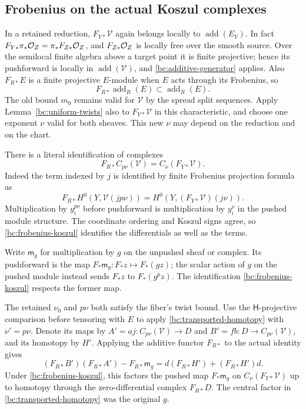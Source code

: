 \subsection{Frobenius on the actual Koszul complexes}

In a retained reduction, $F_{Y*}\mathcal V$ again belongs locally to
$\operatorname{add}(E_Y)$.  In fact
$F_{Y*}\pi_*\mathcal O_Z=\pi_*F_{Z*}\mathcal O_Z$, and
$F_{Z*}\mathcal O_Z$ is locally free over the smooth source.  Over the
semilocal finite algebra above a target point it is finite projective; hence its
pushforward is locally in $\operatorname{add}(\mathcal V)$, and
\eqref{bc:additive-generator} applies.  Also $F_{R*}E$ is a finite
projective $E$-module when $E$ acts through its Frobenius, so
\begin{equation}\label{bc:frobenius-add}
             F_{R*}\operatorname{add}_R(E)
                             \subset\operatorname{add}_R(E).
\end{equation}
The old bound $m_0$ remains valid for $\mathcal V$ by the spread split
sequences.  Apply Lemma~\ref{bc:uniform-twists} also to
$F_{Y*}\mathcal V$ in this characteristic, and choose one exponent
$\nu$ valid for both sheaves.  This new $\nu$ may depend on the reduction
and on the chart.

There is a literal identification of complexes
\begin{equation}\label{bc:frobenius-koszul}
 F_{R*}C_{p\nu}(\mathcal V)=C_\nu(F_{Y*}\mathcal V).
\end{equation}
Indeed the term indexed by $j$ is identified by finite Frobenius
projection formula as
\[
 F_{R*}H^0(Y,\mathcal V(jp\nu))
      =H^0(Y,(F_{Y*}\mathcal V)(j\nu)).
\]
Multiplication by $y_i^{p\nu}$ before pushforward is multiplication by
$y_i^\nu$ in the pushed module structure.  The coordinate ordering and
Koszul signs agree, so \eqref{bc:frobenius-koszul} identifies the
differentials as well as the terms.

Write $\mathsf m_g$ for multiplication by $g$ on the unpushed sheaf or
complex.  Its pushforward is the map
$F_*\mathsf m_g:F_*z\mapsto F_*(gz)$; the scalar action of $g$ on the
pushed module instead sends $F_*z$ to $F_*(g^pz)$.  The identification
\eqref{bc:frobenius-koszul} respects the former map.

The retained $\nu_0$ and $p\nu$ both satisfy the fiber's twist bound.
Use the $\mathsf H$-projective comparison before tensoring with $E$ to
apply \eqref{bc:transported-homotopy} with $\nu'=p\nu$.  Denote its
maps by $A'=aj:C_{p\nu}(\mathcal V)\to D$ and
$B'=fb:D\to C_{p\nu}(\mathcal V)$, and its homotopy by $H'$.
Applying the additive functor $F_{R*}$ to the actual identity gives
\begin{equation}\label{bc:pushed-homotopy}
 (F_{R*}B')(F_{R*}A')-F_{R*}\mathsf m_g
             =d(F_{R*}H')+(F_{R*}H')d.
\end{equation}
Under \eqref{bc:frobenius-koszul}, this factors the pushed map
$F_*\mathsf m_g$ on $C_\nu(F_{Y*}\mathcal V)$ up to homotopy through
the zero-differential complex $F_{R*}D$.  The central factor in
\eqref{bc:transported-homotopy} was the original $g$.

